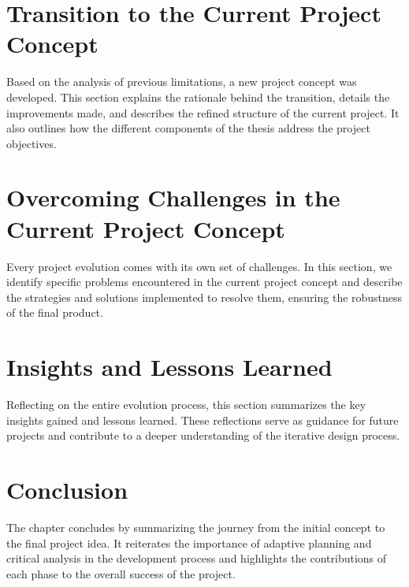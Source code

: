 \section{Transition to the Current Project Concept}
Based on the analysis of previous limitations, a new project concept was developed. This section explains the rationale behind the transition, details the improvements made, and describes the refined structure of the current project. It also outlines how the different components of the thesis address the project objectives.

\section{Overcoming Challenges in the Current Project Concept}
Every project evolution comes with its own set of challenges. In this section, we identify specific problems encountered in the current project concept and describe the strategies and solutions implemented to resolve them, ensuring the robustness of the final product.

\section{Insights and Lessons Learned}
Reflecting on the entire evolution process, this section summarizes the key insights gained and lessons learned. These reflections serve as guidance for future projects and contribute to a deeper understanding of the iterative design process.

\section{Conclusion}
The chapter concludes by summarizing the journey from the initial concept to the final project idea. It reiterates the importance of adaptive planning and critical analysis in the development process and highlights the contributions of each phase to the overall success of the project.
